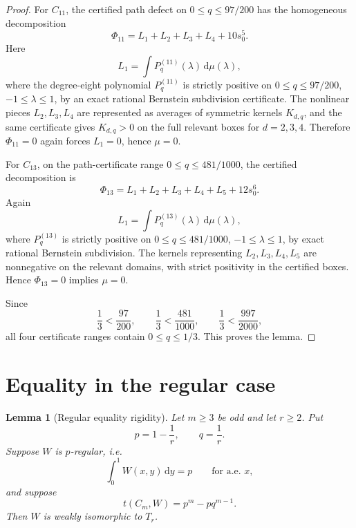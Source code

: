 \documentclass[11pt]{article}
\newtheorem{lemma}[theorem]{Lemma}
\newcommand{\dd}{\,\mathrm d}
\begin{document}
\begin{proof}
For \(C_{11}\), the certified path defect on
\(0\le q\le97/200\) has the homogeneous decomposition
\[
        \Phi_{11}=L_1+L_2+L_3+L_4+10s_0^5.
\]
Here
\[
        L_1=\int P_q^{(11)}(\lambda)\dd\mu(\lambda),
\]
where the degree-eight polynomial \(P_q^{(11)}\) is strictly positive on
\(0\le q\le97/200\), \(-1\le\lambda\le1\), by an exact rational Bernstein
subdivision certificate.  The nonlinear pieces \(L_2,L_3,L_4\) are represented
as averages of symmetric kernels \(K_{d,q}\), and the same certificate gives
\(K_{d,q}>0\) on the full relevant boxes for \(d=2,3,4\).  Therefore
\(\Phi_{11}=0\) again forces \(L_1=0\), hence \(\mu=0\).

For \(C_{13}\), on the path-certificate range \(0\le q\le481/1000\), the
certified decomposition is
\[
        \Phi_{13}=L_1+L_2+L_3+L_4+L_5+12s_0^6.
\]
Again
\[
        L_1=\int P_q^{(13)}(\lambda)\dd\mu(\lambda),
\]
where \(P_q^{(13)}\) is strictly positive on
\(0\le q\le481/1000\), \(-1\le\lambda\le1\), by exact rational Bernstein
subdivision.  The kernels representing \(L_2,L_3,L_4,L_5\) are nonnegative on
the relevant domains, with strict positivity in the certified boxes.  Hence
\(\Phi_{13}=0\) implies \(\mu=0\).

Since
\[
        \frac13<\frac{97}{200},\qquad
        \frac13<\frac{481}{1000},\qquad
        \frac13<\frac{997}{2000},
\]
all four certificate ranges contain \(0\le q\le1/3\).  This proves the lemma.
\end{proof}

\section{Equality in the regular case}

\begin{lemma}[Regular equality rigidity]
\label{lem:regular-rigidity}
Let \(m\ge3\) be odd and let \(r\ge2\).  Put
\[
        p=1-\frac1r,
        \qquad q=\frac1r.
\]
Suppose \(W\) is \(p\)-regular, i.e.
\[
        \int_0^1 W(x,y)\dd y=p
        \qquad\text{for a.e. }x,
\]
and suppose
\[
        t(C_m,W)=p^m-pq^{m-1}.
\]
Then \(W\) is weakly isomorphic to \(T_r\).
\end{lemma}
\end{document}
